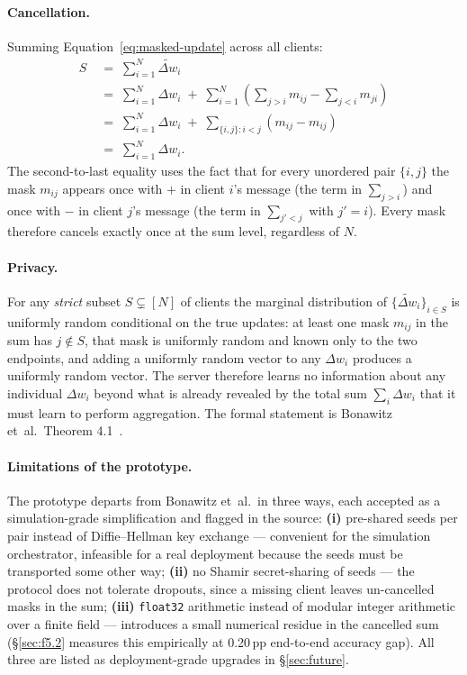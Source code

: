\documentclass[11pt,a4paper]{report}
\begin{document}
\paragraph{Cancellation.} Summing
Equation~\eqref{eq:masked-update} across all clients:
\begin{align}
  S \;&=\; \sum_{i=1}^{N} \tilde{\Delta w}_i \nonumber \\
       &=\; \sum_{i=1}^{N} \Delta w_i
            \;+\; \sum_{i=1}^{N} \!\left( \sum_{j > i} m_{ij}
                                        - \sum_{j < i} m_{ji} \right) \nonumber \\
       &=\; \sum_{i=1}^{N} \Delta w_i
            \;+\; \sum_{\{i,j\}: i<j} (m_{ij} - m_{ij}) \nonumber \\
       &=\; \sum_{i=1}^{N} \Delta w_i. \label{eq:cancellation}
\end{align}
The second-to-last equality uses the fact that for every unordered pair
$\{i,j\}$ the mask $m_{ij}$ appears once with $+$ in client $i$'s
message (the term in $\sum_{j > i}$) and once with $-$ in client $j$'s
message (the term in $\sum_{j' < j}$ with $j' = i$). Every mask therefore
cancels exactly once at the sum level, regardless of $N$.

\paragraph{Privacy.} For any \emph{strict} subset $S \subsetneq [N]$ of
clients the marginal distribution of $\{\tilde{\Delta w}_i\}_{i \in S}$ is
uniformly random conditional on the true updates: at least one mask
$m_{ij}$ in the sum has $j \notin S$, that mask is uniformly random and
known only to the two endpoints, and adding a uniformly random vector to
any $\Delta w_i$ produces a uniformly random vector. The server therefore
learns no information about any individual $\Delta w_i$ beyond what is
already revealed by the total sum $\sum_i \Delta w_i$ that it must learn
to perform aggregation. The formal statement is Bonawitz et~al.\ Theorem
4.1~\cite{bonawitz2017secagg}.

\paragraph{Limitations of the prototype.}
The prototype departs from Bonawitz et~al.\ in three ways, each accepted
as a simulation-grade simplification and flagged in the source:
\textbf{(i)} pre-shared seeds per pair instead of Diffie--Hellman key
exchange — convenient for the simulation orchestrator, infeasible for a
real deployment because the seeds must be transported some other way;
\textbf{(ii)} no Shamir secret-sharing of seeds — the protocol does not
tolerate dropouts, since a missing client leaves un-cancelled masks in
the sum; \textbf{(iii)} \texttt{float32} arithmetic instead of modular
integer arithmetic over a finite field — introduces a small numerical
residue in the cancelled sum (\S\ref{sec:f5.2} measures this empirically
at 0.20\,pp end-to-end accuracy gap). All three are listed as
deployment-grade upgrades in \S\ref{sec:future}.
\end{document}
